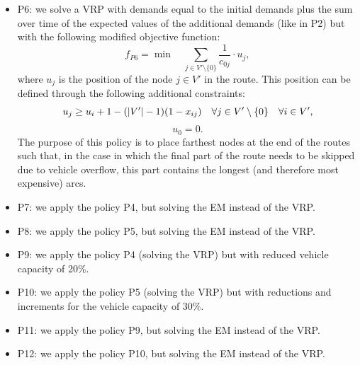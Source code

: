 \documentclass[preprint,11pt,authoryear]{elsarticle}
\begin{document}
\begin{itemize}
\item P6:  we solve a VRP with demands equal to the initial demands plus the sum over time of the expected values of the additional demands (like in P2) but with the following modified objective function:
$$
 f_{P6} =  \min \quad  \sum_{j \in V'\setminus\{0\}} \frac{1}{c_{0j}} \cdot u_{j},   
$$
where $u_{j}$ is the position of the node $j \in V'$ in the route. This position can be defined through the following additional constraints:
$$
u_{j}  \geq u_{i} +1 - (|V'|-1) (1-x_{ij})  \quad \forall j \in V'\setminus\{0\} \quad \forall i \in V',\vspace{-0.3cm}
$$
%
$$
u_{0}=0.  
$$
The purpose of this policy is to place farthest nodes at the end of the routes such that, in the case in which the final part of the route needs to be skipped due to vehicle overflow, this part contains the longest (and therefore most expensive) arcs.


\item P7: we apply the policy P4, but solving the EM instead of the VRP. 

\item P8: we apply the policy P5, but solving the EM instead of the VRP. 

\item P9: we apply the policy P4 (solving the VRP) but with reduced vehicle capacity of 20\%.

\item P10: we apply the policy P5 (solving the VRP) but with reductions and increments for the vehicle capacity of 30\%.

\item P11: we apply the policy P9, but solving the EM instead of the VRP.

\item P12: we apply the policy P10, but solving the EM instead of the VRP.
\end{itemize}


\end{document}
